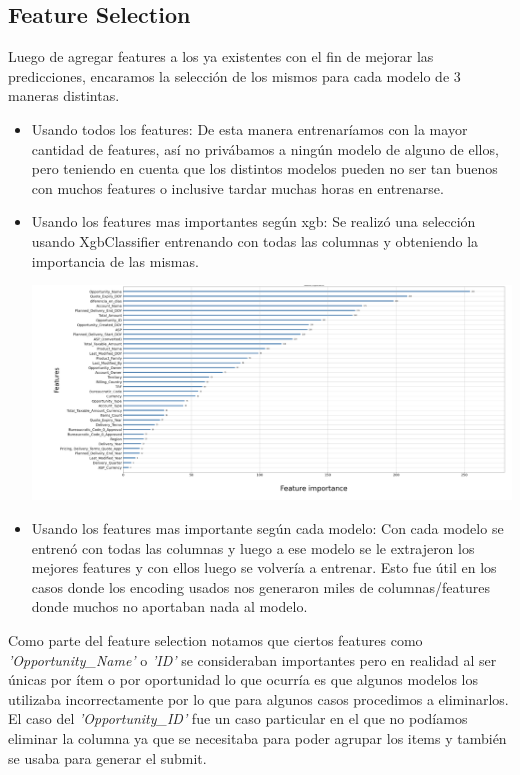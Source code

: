 \documentclass[12pt,a4paper]{article}
\begin{document}
\subsection{Feature Selection}
Luego de agregar features a los ya existentes con el fin de mejorar las predicciones, encaramos la selección de los mismos para cada modelo de 3 maneras distintas. 
 \begin{itemize}
        \item Usando todos los features: De esta manera entrenaríamos con la mayor cantidad de features, así no privábamos a ningún modelo de alguno de ellos, pero teniendo en cuenta que los distintos modelos pueden no ser tan buenos con muchos features o inclusive tardar muchas horas en entrenarse.
        \item Usando los features mas importantes según xgb: Se realizó una selección usando XgbClassifier entrenando con todas las columnas y obteniendo la importancia de las mismas.
        \begin{center}
            \includegraphics[scale=0.5]{imgs/feature-selection-xgb.png}
        \end{center}
        \item Usando los features mas importante según cada modelo: Con cada modelo se entrenó con todas las columnas y luego a ese modelo se le extrajeron los mejores features y con ellos luego se volvería a entrenar.
        Esto fue útil en los casos donde los encoding usados nos generaron miles de columnas/features donde muchos no aportaban nada al modelo.
    \end{itemize}
    
Como parte del feature selection notamos que ciertos features como \textit{'Opportunity\_Name'} o \textit{'ID'} se consideraban importantes pero en realidad al ser únicas por ítem o por oportunidad lo que ocurría es que algunos modelos los utilizaba incorrectamente por lo que para algunos casos procedimos a eliminarlos.
El caso del \textit{'Opportunity\_ID'} fue un caso particular en el que no podíamos eliminar la columna ya que se necesitaba para poder agrupar los items y también se usaba para generar el submit.
\end{document}
